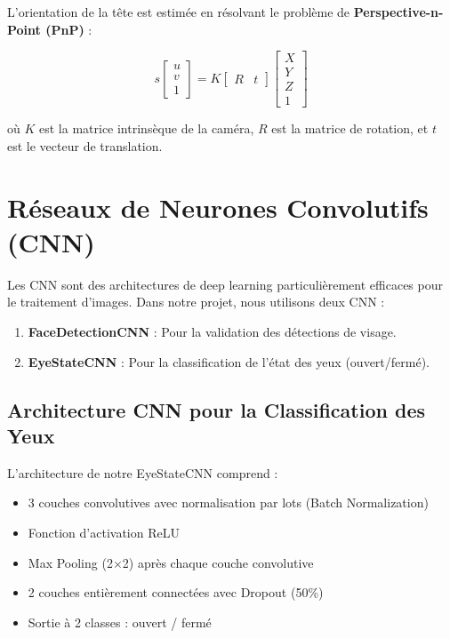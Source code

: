 \documentclass[12pt,a4paper]{report}
\begin{document}
L'orientation de la tête est estimée en résolvant le problème de \textbf{Perspective-n-Point (PnP)} :

\begin{equation}
    s \begin{bmatrix} u \\ v \\ 1 \end{bmatrix} = K \begin{bmatrix} R & t \end{bmatrix} \begin{bmatrix} X \\ Y \\ Z \\ 1 \end{bmatrix}
\end{equation}

où $K$ est la matrice intrinsèque de la caméra, $R$ est la matrice de rotation, et $t$ est le vecteur de translation.

\section{Réseaux de Neurones Convolutifs (CNN)}

Les CNN sont des architectures de deep learning particulièrement efficaces pour le traitement d'images. Dans notre projet, nous utilisons deux CNN :

\begin{enumerate}
    \item \textbf{FaceDetectionCNN} : Pour la validation des détections de visage.
    \item \textbf{EyeStateCNN} : Pour la classification de l'état des yeux (ouvert/fermé).
\end{enumerate}

\subsection{Architecture CNN pour la Classification des Yeux}

L'architecture de notre EyeStateCNN comprend :
\begin{itemize}
    \item 3 couches convolutives avec normalisation par lots (Batch Normalization)
    \item Fonction d'activation ReLU
    \item Max Pooling (2$\times$2) après chaque couche convolutive
    \item 2 couches entièrement connectées avec Dropout (50\%)
    \item Sortie à 2 classes : ouvert / fermé
\end{itemize}
\end{document}
